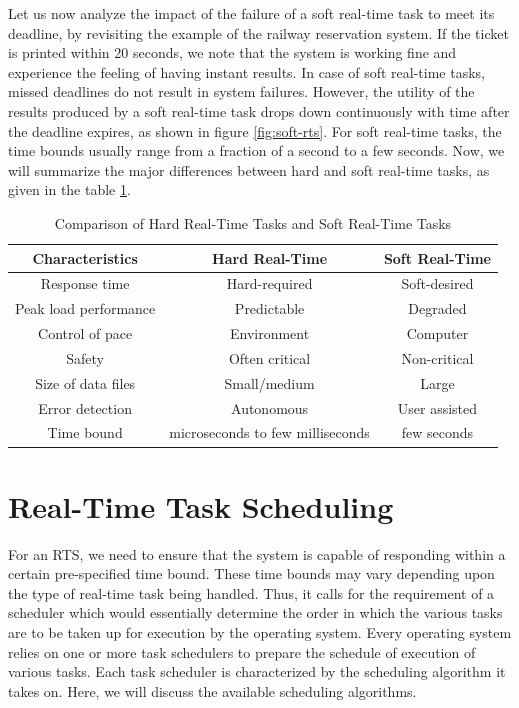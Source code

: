 \documentclass[12pt]{report}
\begin{document}
Let us now analyze the impact of the failure of a soft real-time task to meet its deadline, by revisiting the example of the railway reservation system. If the ticket is printed within 20 seconds, we note that the system is working fine and experience the feeling of having instant results. In case of soft real-time tasks, missed deadlines do not result in system failures. However, the  utility of the results produced by a soft real-time task drops down continuously with time after the deadline expires,  as shown in figure \ref{fig:soft-rts}. For soft real-time tasks, the time bounds usually range from a fraction of a second to a few seconds. Now, we will summarize the major differences between hard and soft real-time tasks, as given in the table \ref{table:2}.  
\begin{table}[h]
\centering
\begin{tabular}{|c|c|c|}
 \hline
 \textbf{Characteristics} &  \textbf{Hard Real-Time} & \textbf{Soft Real-Time}\\
 \hline \hline
 Response time & Hard-required & Soft-desired\\ 
 \hline
 Peak load performance & Predictable & Degraded \\
 \hline
 Control of pace & Environment & Computer \\ 
 \hline
 Safety & Often critical & Non-critical \\
 \hline
 Size of data files & Small/medium & Large \\
 \hline
 Error detection & Autonomous & User assisted\\
 \hline
 Time bound & microseconds to few milliseconds & few seconds\\
 \hline
\end{tabular}
\caption{Comparison of Hard Real-Time Tasks and Soft Real-Time Tasks}
\label{table:2}
\end{table}

\chapter{Real-Time Task Scheduling}
For an RTS, we need to ensure that the system is capable of responding within a certain pre-specified time bound. These time bounds may vary depending upon the type of real-time task being handled. Thus, it calls for the requirement of a scheduler which would essentially determine the order in which the various tasks are to be taken up for execution by the operating system. Every operating system relies on one or more task schedulers to prepare the schedule of execution of various tasks. Each task scheduler is characterized by the scheduling algorithm it takes on. Here, we will discuss the available scheduling algorithms. 
\end{document}

